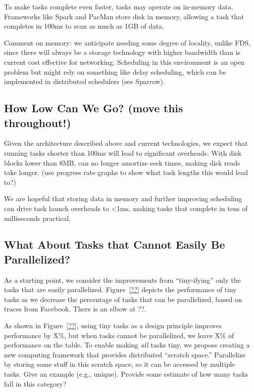 {To make tasks complete even faster, tasks may operate on in-memory data.
Frameworks like Spark and PacMan store disk in memory, allowing a task that
completes in 100ms to scan as much as 1GB of data.

Comment on memory: we anticipate needing some degree of locality, unlike FDS,
since there will always be a storage technology with higher bandwidth than
is current cost effective for networking. Scheduling in this environment
is an open problem but might rely on something like delay scheduling, which
can be implemented in distributed schedulers (see Sparrow).

\subsection{How Low Can We Go? (move this throughout!)}
Given the architecture described above and current technologies, we expect that
running tasks shorter than 100ms will lead to significant overheads. With disk
blocks lower than 8MB, can no longer amortize seek times, making disk reads take
longer. (use progress rate graphs to show what task lengths this would lead to?)

We are hopeful that storing data in memory and further
improving scheduling can drive task launch overheads to <1ms, making tasks that
complete in tens of milliseconds practical.

\subsection{What About Tasks that Cannot Easily Be Parallelized?}
As a starting point, we consider the improvements from ``tiny-ifying'' only the
tasks that are easily parallelized.  Figure~\ref{??} depicts the performance of
tiny tasks as we decrease the percentage of tasks that can be parallelized, based
on traces from Facebook.  There is an elbow at ??.

As shown in Figure~\ref{??}, using tiny tasks as a design principle improves
performance by X\%, but when tasks cannot be parallelized, we leave X\% of
performance on the table.  To enable making \emph{all} tasks tiny, we propose
creating a new computing framework that provides distributed ``scratch space.''
Parallelize by storing some stuff in this scratch space, so it can be accessed
by multiple tasks.  Give an example (e.g., unique). Provide some estimate
of how many tasks fall in this category?
}
